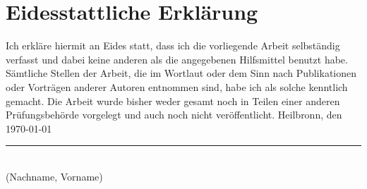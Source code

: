 \newpage
\chapter*{Eidesstattliche Erklärung} %
\label{sec:eidesstattlicheErklärung}
Ich erkläre hiermit an Eides statt, dass ich die vorliegende Arbeit selbständig verfasst und dabei keine anderen als die angegebenen Hilfsmittel benutzt habe. Sämtliche Stellen der Arbeit, die im Wortlaut oder dem Sinn nach Publikationen oder Vorträgen anderer Autoren entnommen sind, habe ich als solche kenntlich gemacht. Die Arbeit wurde bisher weder gesamt noch in Teilen einer anderen Prüfungsbehörde vorgelegt und auch noch nicht veröffentlicht.
\newline
\newline
\newline
\newline
Heilbronn, den {\today}
\noindent
\hfill 
\begin{minipage}[t]{0.4\textwidth} 
    \centering 
    \rule{\textwidth}{0.4pt} \\ 
    (Nachname, Vorname) 
\end{minipage}
